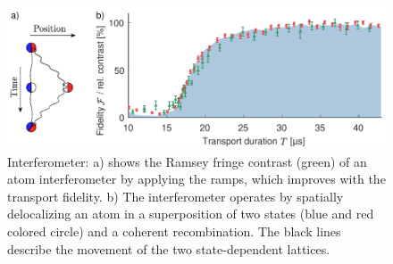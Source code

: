 \documentclass[aps,pra,reprint,a4paper,nofootinbib,superscriptaddress,numbers,longbibliography,showpacs,showkeys,floatfix]{revtex4-1}
\begin{document}
\begin{figure}
	\centering
	\includegraphics[width=\textwidth]{figure4.pdf}
	\caption[]{Interferometer: a) shows the Ramsey fringe contrast (green) of an atom interferometer by applying the ramps, which improves with the transport fidelity. b) The interferometer operates by spatially delocalizing an atom in a superposition of two states (blue and red colored circle) and a coherent recombination. The black lines describe the movement of the two state-dependent lattices.}
	\label{Fig:Interferometer}
\end{figure}



\end{document}

